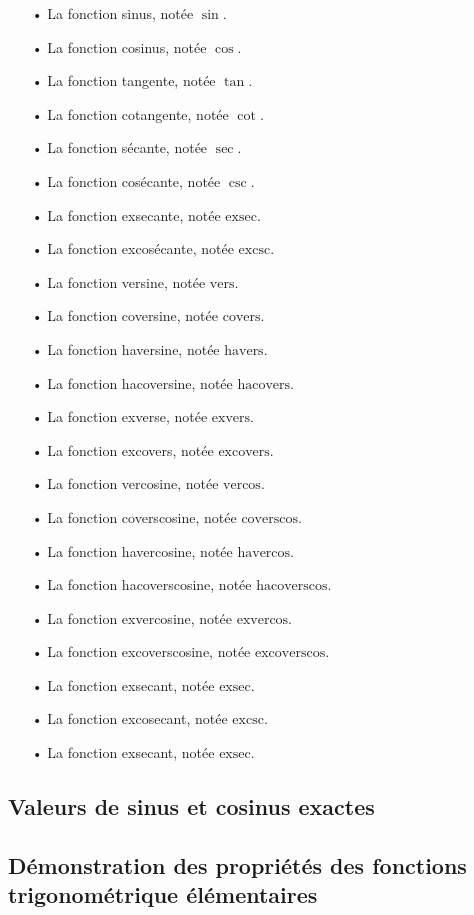 \documentclass[a4paper]{article}
\begin{document}
		\begin{itemize}
				\item [•] La fonction sinus, notée $\sin$.
				\item [•] La fonction cosinus, notée $\cos$.
				\item [•] La fonction tangente, notée $\tan$.
				\item [•] La fonction cotangente, notée $\cot$.
				\item [•] La fonction sécante, notée $\sec$.
				\item [•] La fonction cosécante, notée $\csc$.
				\item [•] La fonction exsecante, notée $\text{exsec}$.
				\item [•] La fonction excosécante, notée $\text{excsc}$.
				\item [•] La fonction versine, notée $\text{vers}$.
				\item [•] La fonction coversine, notée $\text{covers}$.
				\item [•] La fonction haversine, notée $\text{havers}$.
				\item [•] La fonction hacoversine, notée $\text{hacovers}$.
				\item [•] La fonction exverse, notée $\text{exvers}$.
				\item [•] La fonction excovers, notée $\text{excovers}$.
				\item [•] La fonction vercosine, notée $\text{vercos}$.
				\item [•] La fonction coverscosine, notée $\text{coverscos}$.
				\item [•] La fonction havercosine, notée $\text{havercos}$.
				\item [•] La fonction hacoverscosine, notée $\text{hacoverscos}$.
				\item [•] La fonction exvercosine, notée $\text{exvercos}$.
				\item [•] La fonction excoverscosine, notée $\text{excoverscos}$.
				\item [•] La fonction exsecant, notée $\text{exsec}$.
				\item [•] La fonction excosecant, notée $\text{excsc}$.
				\item [•] La fonction exsecant, notée $\text{exsec}$.
			\end{itemize}

		\subsection*{Valeurs de sinus et cosinus exactes} \label{valeur_remarquable_trigo}

		\subsection*{Démonstration des propriétés des fonctions trigonométrique élémentaires} \label{demo_propriete_trigo_1}
\end{document}
